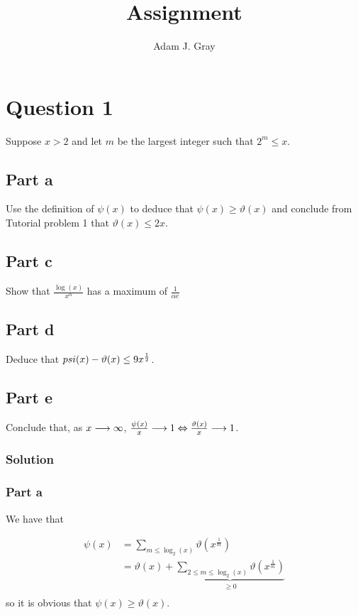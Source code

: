 \documentclass{unswmaths}
\begin{document}
\author{Adam J. Gray}
\subject{Number Theory}
\title{Assignment}

\unswtitle

\section*{Question 1}

Suppose $ x > 2 $ and let $ m $ be the largest integer such that $ 2^m \leq x $.

\subsection*{Part a}
Use the definition of $ \psi(x) $ to deduce that $ \psi(x) \geq \vartheta(x) $ and conclude from Tutorial problem 1 that
$ \vartheta(x) \leq 2x $.

\subsection*{Part c}

Show that $ \frac{\log(x) }{x^\alpha} $ has a maximum of $ \frac{1}{\alpha e} $

\subsection*{Part d}

Deduce that $ \\psi(x) - \vartheta(x) \leq 9x^\frac{1}{2} $.

\subsection*{Part e}

Conclude that, as $ x \longrightarrow \infty $, $ \frac{\psi(x)}{x} \longrightarrow 1 \Leftrightarrow \frac{\vartheta(x)}{x} \longrightarrow 1 $.

\subsubsection*{Solution}

\subsubsection*{Part a}

We have that 

\begin{align*}
	\psi(x) &= \sum_{m \leq \log_2(x)} \vartheta(x^\frac{1}{m}) \\
		&= \vartheta(x) + \underbrace{\sum_{2 \leq m \leq \log_2(x)} \vartheta(x^\frac{1}{m})}_{\geq 0} \\
\end{align*}
so it is obvious that $ \psi(x) \geq \vartheta(x) $.
\end{document}
